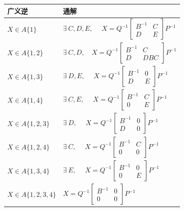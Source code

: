 \begin{table}[H]
    \centering
    \begin{tabular}{ll}
    \toprule
    \textbf{广义逆} & \textbf{通解} \\ \midrule
    $X \in A\{1\}$ & $\exists\ C,D,E,\quad\;X=Q^{-1}\begin{bmatrix}B^{-1}&C\\D&E\end{bmatrix}P^{-1}$ \\
    $X \in A\{1,2\}$ & $\exists\ C,D,\quad X=Q^{-1}\begin{bmatrix}B^{-1}&C\\D&DBC\end{bmatrix}P^{-1}$ \\
    $X \in A\{1,3\}$ & $\exists\ D,E,\quad\;X=Q^{-1}\begin{bmatrix}B^{-1}&0\\D&E\end{bmatrix}P^{-1}$ \\
    $X \in A\{1,4\}$ & $\exists\ C,E,\quad\;X=Q^{-1}\begin{bmatrix}B^{-1}&C\\0&E\end{bmatrix}P^{-1}$ \\
    $X \in A\{1,2,3\}$ & $\exists\ D,\quad\;X=Q^{-1}\begin{bmatrix}B^{-1}&0\\D&0\end{bmatrix}P^{-1}$ \\
    $X \in A\{1,2,4\}$ & $\exists\ C,\quad\;X=Q^{-1}\begin{bmatrix}B^{-1}&C\\0&0\end{bmatrix}P^{-1}$ \\
    $X \in A\{1,3,4\}$ & $\exists\ E,\quad\;X=Q^{-1}\begin{bmatrix}B^{-1}&0\\0&E\end{bmatrix}P^{-1}$ \\
    $X \in A\{1,2,3,4\}$ & $X=Q^{-1}\begin{bmatrix}B^{-1}&0\\0&0\end{bmatrix}P^{-1}$ \\ \bottomrule
    \end{tabular}
\end{table}

